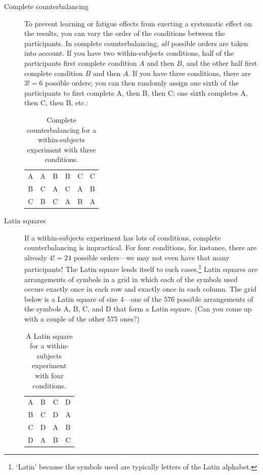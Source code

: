 \documentclass[a4paper]{tufte-book}\usepackage[]{graphicx}\usepackage[]{xcolor}
\begin{document}
\begin{description}
 \item[Complete counterbalancing]
 To prevent learning or fatigue effects from exerting a systematic
 effect on the results, you can vary the order of the conditions
 between the participants.
 In complete counterbalancing, \emph{all} possible orders are 
 taken into account. If you have two within-subjects conditions,
 half of the participants first complete condition $A$ and then $B$,
 and the other half first complete condition $B$ and then $A$.
 If you have three conditions, there are $3! = 6$ possible orders;
 you can then randomly assign one sixth of the participants to 
 first complete A, then B, then C;
 one sixth completes A, then C, then B, etc.:
 
\begin{table}[h]
\centering
\caption{Complete counterbalancing for a within-subjects experiment with three conditions.}
\label{tab:counter}
\begin{tabular}{cccccc}
A & A & B & B & C & C \\
B & C & A & C & A & B \\
C & B & C & A & B & A \\
\end{tabular}
\end{table}
\medskip
 
 \item[Latin squares] 
 If a within-subjects experiment has lots of conditions,
 complete counterbalancing is impractical. For four conditions,
 for instance, there are already $4! = 24$ possible orders---we may not
 even have that many participants! The Latin square lends itself
 to such cases.\footnote{`Latin' because the symbols used are typically
 letters of the Latin alphabet.} Latin squares are arrangements of symbols in a grid in which
 each of the symbols used occurs exactly once
 in each row and exactly once in each column. The grid below is a Latin square
 of size 4---one of the 576 possible arrangements of the symbols A, B, C, and D
 that form a Latin square. (Can you come up with a couple of the other 575 ones?)
 
 \begin{table}[h]
\centering
\caption{A Latin square for a within-subjects experiment with four conditions.}
\label{tab:latquad}
\begin{tabular}{cccc}
A & B & C & D \\
B & C & D & A \\
C & D & A & B \\
D & A & B & C \\ 
\end{tabular}
\end{table}
\medskip


\end{description}
\end{document}
